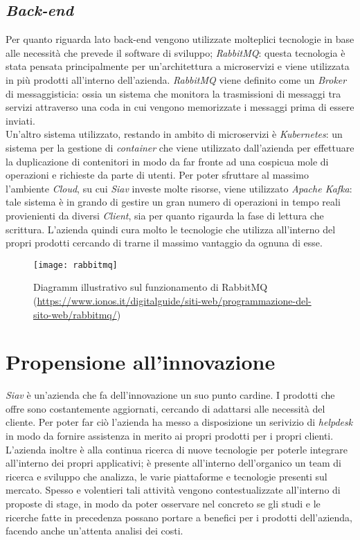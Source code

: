 \subsection{\textit{Back-end}}
Per quanto riguarda lato back-end vengono utilizzate molteplici tecnologie in base alle necessità che prevede il software di sviluppo;  \textit{RabbitMQ}: questa tecnologia è stata pensata principalmente per un'architettura a microservizi e viene utilizzata in più prodotti all'interno dell'azienda. \textit{RabbitMQ} viene definito come un \textit{\gls{Broker}} di messaggisticia: ossia un sistema che monitora la trasmissioni di messaggi tra servizi attraverso una coda in cui vengono memorizzate i messaggi prima di essere inviati.\\ Un'altro sistema utilizzato, restando in ambito di microservizi è \textit{Kubernetes}: un sistema per la gestione di \textit{container} che viene utilizzato dall'azienda per effettuare la duplicazione di contenitori in modo da far fronte ad una cospicua mole di operazioni e richieste da parte di utenti. Per poter sfruttare al massimo l'ambiente \textit{Cloud}, su cui \textit{Siav} investe molte risorse, viene utilizzato \textit{Apache Kafka}: tale sistema è in grando di gestire un gran numero di operazioni in tempo reali provienienti da diversi \textit{Client}, sia per quanto rigaurda la fase di lettura che scrittura. L'azienda quindi cura molto le tecnologie che utilizza all'interno del propri prodotti cercando di trarne il massimo vantaggio da ognuna di esse. 

\begin{figure}[!h] 
	\centering 
	\texttt{[image: rabbitmq]} 
	\caption{Diagramm illustrativo sul funzionamento di RabbitMQ
	(\url{https://www.ionos.it/digitalguide/siti-web/programmazione-del-sito-web/rabbitmq/})}
\end{figure}
\section{Propensione all'innovazione}
\textit{Siav} è un'azienda che fa dell'innovazione un suo punto cardine. I prodotti che offre sono costantemente aggiornati, cercando di adattarsi alle necessità del cliente. Per poter far ciò l'azienda ha messo a disposizione un serivizio di \textit{\gls{helpdesk}} in modo da fornire assistenza in merito ai propri prodotti per i propri clienti. L'azienda inoltre è alla continua ricerca di nuove tecnologie per poterle integrare all'interno dei propri applicativi; è presente all'interno dell'organico un team di ricerca e sviluppo che analizza, le varie piattaforme e tecnologie presenti sul mercato. Spesso e volentieri tali attività vengono contestualizzate all'interno di proposte di stage, in modo da poter osservare nel concreto se gli studi e le ricerche fatte in precedenza possano portare a benefici per i prodotti dell'azienda, facendo anche un'attenta analisi dei costi. 
